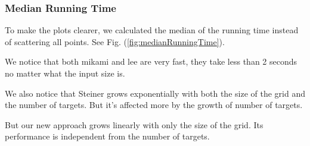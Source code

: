 \subsubsection{Median Running Time}
To make the plots clearer, we calculated the median of the running time instead of scattering all points. See Fig. (\ref{fig:medianRunningTime}).

We notice that both mikami and lee are very fast, they take less than 2 seconds no matter what the input size is.

We also notice that Steiner grows exponentially with both the size of the grid and the number of targets. But it's affected more by the growth of number of targets.

But our new approach grows linearly with only the size of the grid. Its performance is independent from the number of targets.

